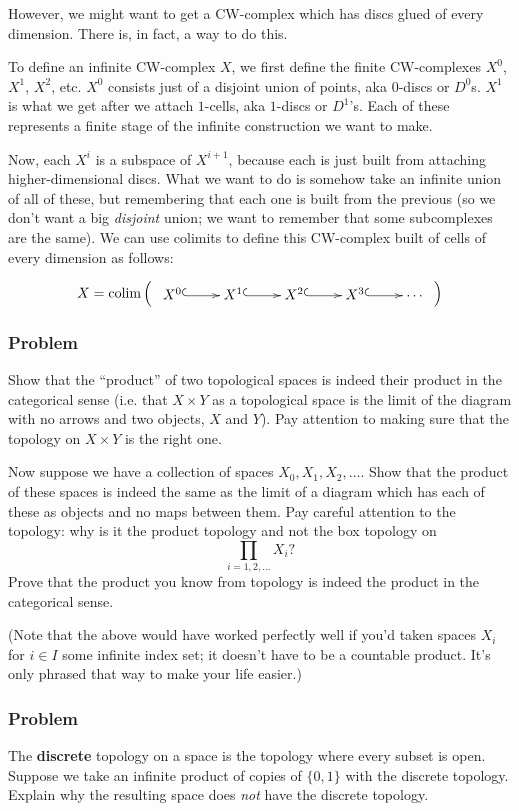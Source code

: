\documentclass[12pt]{article}
\newcounter{problemcounter}
\newcounter{problempartcounter}
\newcommand{\problem}{\addtocounter{problemcounter}{1}\setcounter{problempartcounter}{0}\subsubsection*{Problem \theproblemcounter}}
\begin{document}
However, we might want to get a CW-complex which has discs glued of every dimension.  There is, in fact, a way to do this.

To define an infinite CW-complex $X$, we first define the finite CW-complexes $X^0$, $X^1$, $X^2$, etc.  $X^0$ consists just of a disjoint union of points, aka $0$-discs or $D^0$s.  $X^1$ is what we get after we attach $1$-cells, aka $1$-discs or $D^1$'s.  Each of these represents a finite stage of the infinite construction we want to make.

Now, each $X^i$ is a subspace of $X^{i + 1}$, because each is just built from attaching higher-dimensional discs.  What we want to do is somehow take an infinite union of all of these, but remembering that each one is built from the previous (so we don't want a big \textit{disjoint} union; we want to remember that some subcomplexes are the same).  We can use colimits to define this CW-complex built of cells of every dimension as follows:

$$X = \textrm{colim} \left( \begin{array}{l} \xymatrix{ X^0\ar@{^(->}[r] & X^1\ar@{^(->}[r] & X^2\ar@{^(->}[r] & X^3\ar@{^(->}[r] & \cdots } \end{array} \right)$$


\problem

Show that the ``product'' of two topological spaces is indeed their product in the categorical sense (i.e. that $X \times Y$ as a topological space is the limit of the diagram with no arrows and two objects, $X$ and $Y$).  Pay attention to making sure that the topology on $X \times Y$ is the right one.

Now suppose we have a collection of spaces $X_0, X_1, X_2, \ldots$.  Show that the product of these spaces is indeed the same as the limit of a diagram which has each of these as objects and no maps between them.  Pay careful attention to the topology: why is it the product topology and not the box topology on $$\prod_{i = 1, 2, \ldots} X_i?$$  Prove that the product you know from topology is indeed the product in the categorical sense.

(Note that the above would have worked perfectly well if you'd taken spaces $X_i$ for $i \in I$ some infinite index set; it doesn't have to be a countable product.  It's only phrased that way to make your life easier.)


\problem

The \textbf{discrete} topology on a space is the topology where every subset is open.  Suppose we take an infinite product of copies of $\{ 0, 1 \}$ with the discrete topology.  Explain why the resulting space does \textit{not} have the discrete topology.
\end{document}
